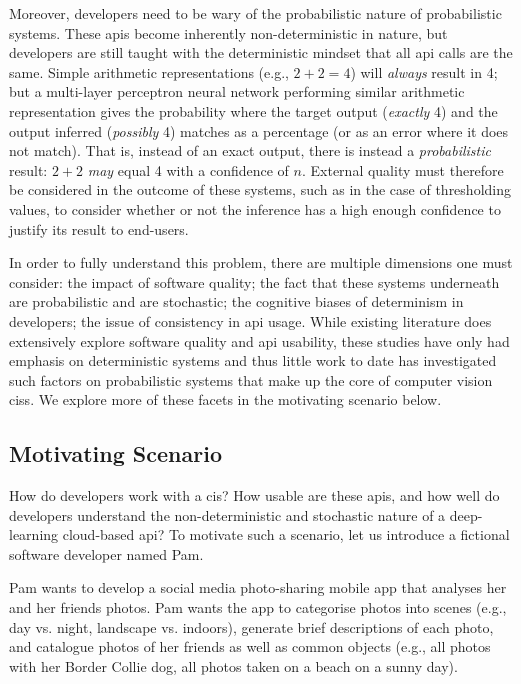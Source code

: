 Moreover, developers need to be wary of the probabilistic nature of probabilistic systems. These \glspl{api} become inherently non-deterministic in nature, but developers are still taught with the deterministic mindset that all \gls{api} calls are the same. Simple arithmetic representations (e.g., $2+2=4$) will \textit{always} result in 4; but a multi-layer perceptron neural network performing similar arithmetic representation \citep{Blake:1998vd} gives the probability where the target output (\textit{exactly} 4) and the output inferred (\textit{possibly} 4) matches as a percentage (or as an error where it does not match). That is, instead of an exact output, there is instead a \textit{probabilistic} result: $2+2$ \textit{may} equal 4 with a confidence of $n$. External quality must therefore be considered in the outcome of these systems, such as in the case of thresholding values, to consider whether or not the inference has a high enough confidence to justify its result to end-users.

In order to fully understand this problem, there are multiple dimensions one must consider: the impact of software quality; the fact that these systems underneath are probabilistic and are stochastic; the cognitive biases of determinism in developers; the issue of consistency in \gls{api} usage. While existing literature does extensively explore software quality and \gls{api} usability, these studies have only had emphasis on deterministic systems and thus little work to date has investigated such factors on probabilistic systems that make up the core of computer vision \glspl{cis}. We explore more of these facets in the motivating scenario below.

\subsection{Motivating Scenario}

  How do developers work with a \gls{cis}? How usable are these \glspl{api}, and how well do developers understand the non-deterministic and stochastic nature of a deep-learning cloud-based \gls{api}? To motivate such a scenario, let us introduce a fictional software developer named Pam.

Pam wants to develop a social media photo-sharing mobile app that analyses her and her friends photos. Pam wants the app to categorise photos into scenes (e.g., day vs. night, landscape vs. indoors), generate brief descriptions of each photo, and catalogue photos of her friends as well as common objects (e.g., all photos with her Border Collie dog, all photos taken on a beach on a sunny day).

